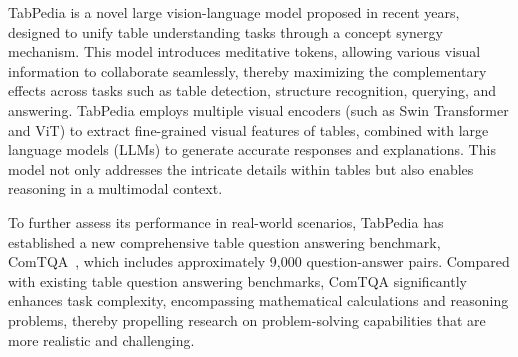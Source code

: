 TabPedia is a novel large vision-language model proposed in recent years, designed to unify table understanding tasks through a concept synergy mechanism. This model introduces meditative tokens, allowing various visual information to collaborate seamlessly, thereby maximizing the complementary effects across tasks such as table detection, structure recognition, querying, and answering. TabPedia employs multiple visual encoders (such as Swin Transformer and ViT) to extract fine-grained visual features of tables, combined with large language models (LLMs) to generate accurate responses and explanations. This model not only addresses the intricate details within tables but also enables reasoning in a multimodal context.

To further assess its performance in real-world scenarios, TabPedia has established a new comprehensive table question answering benchmark, ComTQA~\cite{Zhao2024NEURIPS_TabPedia_Towards_Comprehensive}, which includes approximately 9,000 question-answer pairs. Compared with existing table question answering benchmarks, ComTQA significantly enhances task complexity, encompassing mathematical calculations and reasoning problems, thereby propelling research on problem-solving capabilities that are more realistic and challenging.